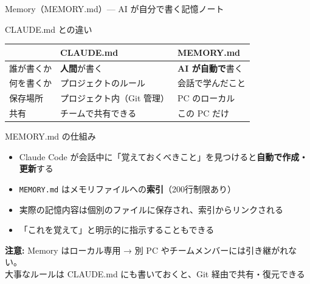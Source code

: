 \documentclass[aspectratio=169, 14pt]{beamer}
\begin{document}
\begin{frame}{Memory（MEMORY.md）— AI が自分で書く記憶ノート}
  \begin{block}{CLAUDE.md との違い}
    {\footnotesize
    \begin{tabular}{lll}
      & \textbf{CLAUDE.md} & \textbf{MEMORY.md} \\
      \hline
      誰が書くか & \textbf{人間}が書く & \textbf{AI が自動で}書く \\
      何を書くか & プロジェクトのルール & 会話で学んだこと \\
      保存場所   & プロジェクト内（Git 管理） & PC のローカル \\
      共有       & チームで共有できる & この PC だけ \\
    \end{tabular}
    }
  \end{block}

  \begin{alertblock}{MEMORY.md の仕組み}
    \begin{itemize}\footnotesize
      \item Claude Code が会話中に「覚えておくべきこと」を見つけると\textbf{自動で作成・更新}する
      \item \texttt{MEMORY.md} はメモリファイルへの\textbf{索引}（200行制限あり）
      \item 実際の記憶内容は個別のファイルに保存され、索引からリンクされる
      \item 「これを覚えて」と明示的に指示することもできる
    \end{itemize}
  \end{alertblock}

  \begin{exampleblock}{}
    {\scriptsize
    \textbf{注意:} Memory はローカル専用 → 別 PC やチームメンバーには引き継がれない。\\
    大事なルールは CLAUDE.md にも書いておくと、Git 経由で共有・復元できる}
  \end{exampleblock}
\end{frame}
\end{document}
